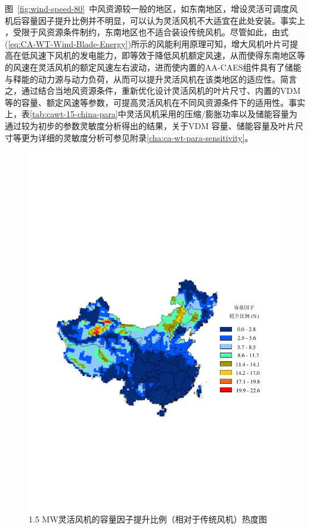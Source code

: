 图~\ref{fig:wind-speed-80}~中风资源较一般的地区，如东南地区，增设灵活可调度风机后容量因子提升比例并不明显，可以认为灵活风机不大适宜在此处安装。事实上 ，受限于风资源条件制约，东南地区也不适合装设传统风机。尽管如此，由式(\ref{eq:CA-WT-Wind-Blade-Energy})所示的风能利用原理可知，增大风机叶片可提高在低风速下风机的发电能力，即等效于降低风机额定风速，从而使得东南地区等的风速在灵活风机的额定风速左右波动，进而使内置的AA-CAES组件具有了储能与释能的动力源与动力负荷，从而可以提升灵活风机在该类地区的适应性。简言之，通过结合当地风资源条件，重新优化设计灵活风机的叶片尺寸、内置的VDM等的容量、额定风速等参数，可提高灵活风机在不同风资源条件下的适用性。事实上，表\ref{tab:cawt-15-china-para}中灵活风机采用的压缩/膨胀功率以及储能容量为通过较为初步的参数灵敏度分析得出的结果，关于VDM 容量、储能容量及叶片尺寸等更为详细的灵敏度分析可参见附录\ref{cha:ca-wt-para-sensitivity}。

\begin{figure}[!htp] %
  \centering
  \includegraphics[scale=0.72]{figures/Chap5-6-CA-WT-15-VDM2-Rel-2.pdf}
  \caption{1.5 MW灵活风机的容量因子提升比例（相对于传统风机）热度图}
  \label{fig:cawt-china-cf-rel}
\end{figure}

